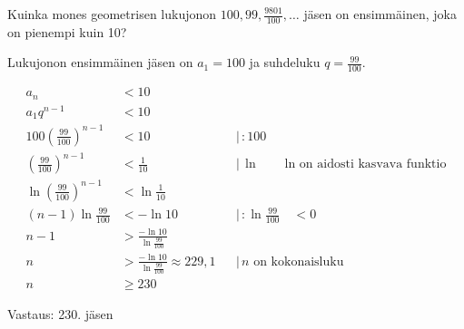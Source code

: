 \begin{esimerkki}

Kuinka mones geometrisen lukujonon $100, 99, \frac{9801}{100}, \ldots$ jäsen on ensimmäinen, joka on pienempi kuin 10?

Lukujonon ensimmäinen jäsen on $a_1=100$ ja suhdeluku $q=\frac{99}{100}$.

\begin{align*}
	            a_n &< 10  \\
	a_1q^{n-1} &< 10  \\
	100(\frac{99}{100})^{n-1} &< 10 & & | \, :100 \\
	(\frac{99}{100})^{n-1} &< \frac{1}{10}  & & | \,  \ln \qquad \text{ln on aidosti kasvava funktio}\\
	\ln (\frac{99}{100})^{n-1} &< \ln \frac{1}{10} \\
	(n-1)\ln \frac{99}{100} &< -\ln 10  & & | \, : \ln \frac{99}{100} \quad <0 \\
	n-1 &>  \frac{-\ln10}{\ln \frac{99}{100}} \\
	n &> \frac{-\ln10}{\ln \frac{99}{100}} \approx 229,1  & & | \, \text {$n$ on kokonaisluku} \\
	n &\ge 230
\end{align*}

Vastaus: 230. jäsen

\end{esimerkki}

